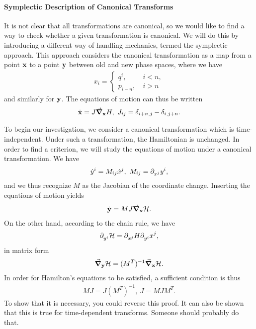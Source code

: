 \paragraph{Symplectic Description of Canonical Transforms}
It is not clear that all transformations are canonical, so we would like to find a way to check whether a given transformation is canonical. We will do this by introducing a different way of handling mechanics, termed the symplectic approach. This approach considers the canonical transformation as a map from a point $\vb{x}$ to a point $\vb{y}$ between old and new phase spaces, where we have
\begin{align*}
	x_{i} =
	\begin{cases}
		q^{i},    \ &i < n, \\
		p_{i - n},\ &i > n
	\end{cases}
\end{align*}
and similarly for $\vb{y}$. The equations of motion can thus be written
\begin{align*}
	\dot{\vb{x}} = J\grad_{\vb{x}}{H},\ J_{ij} = \delta_{i + n, j} - \delta_{i, j + n}.
\end{align*}

To begin our investigation, we consider a canonical transformation which is time-independent. Under such a transformation, the Hamiltonian is unchanged. In order to find a criterion, we will study the equations of motion under a canonical transformation. We have
\begin{align*}
	\dot{y}^{i} = M_{ij}\dot{x}^{j},\ M_{ij} = \partial^{}_{x^{j}}y^{i},
\end{align*}
and we thus recognize $M$ as the Jacobian of the coordinate change. Inserting the equations of motion yields
\begin{align*}
	\dot{\vb{y}} = MJ\grad_{\vb{x}}{\mathcal{H}}.
\end{align*}
On the other hand, according to the chain rule, we have
\begin{align*}
	\partial^{}_{y^{i}}\mathcal{H} = \partial^{}_{x^{j}}H\partial^{}_{y^{i}}x^{j},
\end{align*}
in matrix form
\begin{align*}
	\grad_{\vb{y}}{\mathcal{H}} = (M^{T})^{-1}\grad_{\vb{x}}{\mathcal{H}}.
\end{align*}
In order for Hamilton's equations to be satisfied, a sufficient condition is thus
\begin{align*}
	MJ = J(M^{T})^{-1},\ J = MJM^{T}.
\end{align*}
To show that it is necessary, you could reverse this proof. It can also be shown that this is true for time-dependent transforms. Someone should probably do that.

